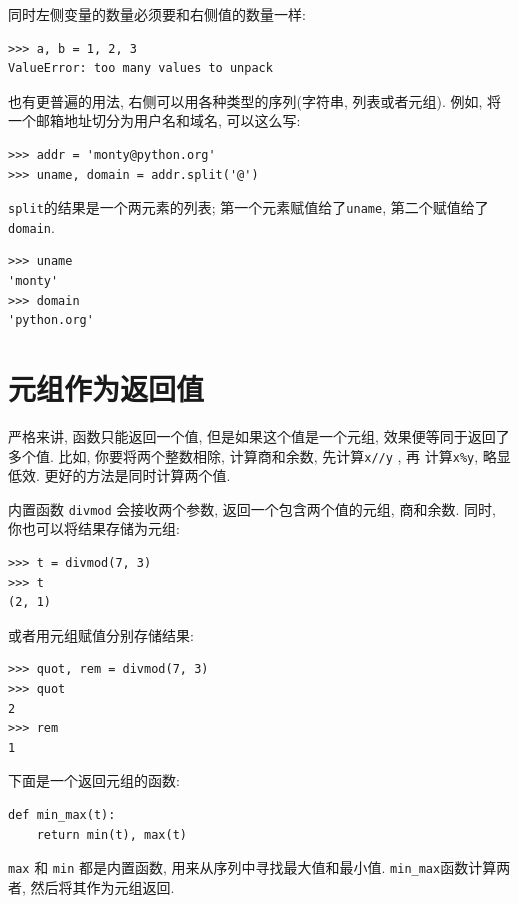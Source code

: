\documentclass[10pt]{book}
\begin{document}
同时左侧变量的数量必须要和右侧值的数量一样:

\begin{verbatim}
>>> a, b = 1, 2, 3
ValueError: too many values to unpack
\end{verbatim}
%
也有更普遍的用法, 右侧可以用各种类型的序列(字符串, 列表或者元组). 
例如, 将一个邮箱地址切分为用户名和域名, 可以这么写:

\begin{verbatim}
>>> addr = 'monty@python.org'
>>> uname, domain = addr.split('@')
\end{verbatim}
%
{\tt split}的结果是一个两元素的列表;
第一个元素赋值给了{\tt uname}, 第二个赋值给了{\tt domain}. 

\begin{verbatim}
>>> uname
'monty'
>>> domain
'python.org'
\end{verbatim}
%

\section{元组作为返回值}
严格来讲, 函数只能返回一个值, 但是如果这个值是一个元组, 
效果便等同于返回了多个值. 
比如, 你要将两个整数相除, 计算商和余数, 先计算{\tt x//y} , 再
计算{\tt x\%y}, 略显低效. 更好的方法是同时计算两个值. 

内置函数 {\tt divmod} 会接收两个参数, 返回一个包含两个值的元组, 
商和余数. 同时, 你也可以将结果存储为元组:

\begin{verbatim}
>>> t = divmod(7, 3)
>>> t
(2, 1)
\end{verbatim}
%
或者用元组赋值分别存储结果:

\begin{verbatim}
>>> quot, rem = divmod(7, 3)
>>> quot
2
>>> rem
1
\end{verbatim}
%
下面是一个返回元组的函数:

\begin{verbatim}
def min_max(t):
    return min(t), max(t)
\end{verbatim}
%
{\tt max} 和 {\tt min} 都是内置函数,  用来从序列中寻找最大值和最小值. 
\verb"min_max"函数计算两者, 然后将其作为元组返回. 
\end{document}

